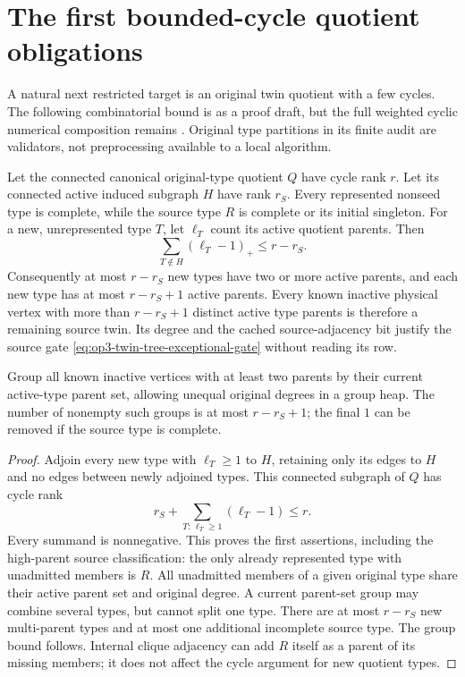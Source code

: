 \section{The first bounded-cycle quotient obligations}
\label{sec:op3-quotient-cycle-frontier}

A natural next restricted target is an original twin quotient with a few
cycles. The following combinatorial bound is \statusproved{} as a proof
draft, but the full weighted cyclic numerical composition remains
\statusopen. Original type partitions in its finite audit are validators,
not preprocessing available to a local algorithm.

\begin{lemma}
\label{lem:op3-quotient-cycle-frontier-budget}
Let the connected canonical original-type quotient $Q$ have cycle rank
$r$. Let its connected active induced subgraph $H$ have rank $r_S$.
Every represented nonseed type is complete, while the source type $R$
is complete or its initial singleton. For a new, unrepresented type $T$,
let $\ell_T$ count its active quotient parents. Then
\[
 \sum_{T\notin H}(\ell_T-1)_+\leq r-r_S.
\]
Consequently at most $r-r_S$ new types have two or more active parents,
and each new type has at most $r-r_S+1$ active parents. Every known
inactive physical vertex with more than $r-r_S+1$ distinct active type
parents is therefore a remaining source twin. Its degree and the cached
source-adjacency bit justify the source gate
\eqref{eq:op3-twin-tree-exceptional-gate} without reading its row.

Group all known inactive vertices with at least two parents by their
current active-type parent set, allowing unequal original degrees in a
group heap. The number of nonempty such groups is at most $r-r_S+1$;
the final $1$ can be removed if the source type is complete.
\end{lemma}
\begin{proof}
Adjoin every new type with $\ell_T\geq1$ to $H$, retaining only its edges
to $H$ and no edges between newly adjoined types. This connected subgraph
of $Q$ has cycle rank
\[
 r_S+\sum_{T:\,\ell_T\geq1}(\ell_T-1)\leq r.
\]
Every summand is nonnegative. This proves the first assertions, including
the high-parent source classification: the only already represented type
with unadmitted members is $R$. All unadmitted members of a given original
type share their active parent set and original degree. A current parent-set
group may combine several types, but cannot split one type. There are at
most $r-r_S$ new multi-parent types and at most one additional incomplete
source type. The group bound follows. Internal clique adjacency can add
$R$ itself as a parent of its missing members; it does not affect the
cycle argument for new quotient types.
\end{proof}

